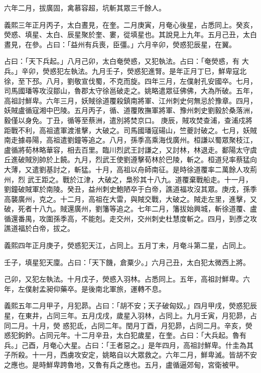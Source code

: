 \begin{pinyinscope}
 六年二月，拔廣固，禽慕容超，坑斬其眾三千餘人。



 義熙三年正月丙子，太白晝見，在奎。二月庚寅，月奄心後星，占悉同上。癸亥，熒惑、填星、太白、辰星聚於奎、婁，從填星也。其說見上九年。五月己丑，太白晝見，在參。占曰：「益州有兵喪，臣彊。」六月辛卯，熒惑犯辰星，在翼。



 占曰：「天下兵起。」八月己卯，太白奄熒惑，又犯執法。占曰：「奄熒惑，有
 大兵。」辛卯，熒惑犯左執法。九月壬子，熒惑犯進腎。是年正月丁巳，鮮卑寇北徐，至下邳。八月，劉敬宣伐蜀，不克而旋。四年三月，左僕射孔安國卒。七月，司馬國璠等攻沒鄒山，魯郡太守徐邕破走之。姚略遣眾征佛佛，大為所破。五年，高祖討鮮卑。六年三月，妖賊徐道覆殺鎮南將軍、江州刺史何無忌於豫章。四月，妖賊盧循寇湘中巴陵。五月丙子，循、道覆敗撫軍將軍、豫州刺史劉毅於桑落洲，毅僅以身免。丁丑，循等至蔡洲，遣別將焚京口。
 庚辰，賊攻焚查浦，查浦戍將距戰不利，高祖遣軍渡淮擊，大破之。司馬國璠寇碭山，竺夔討破之。七月，妖賊南走據尋陽，高祖遣劉鐘等追之。八月，孫季高乘海伐廣州。桓謙以蜀眾聚枝江，盧循將荀林略華容，相去百里。臨川烈武王討謙之，又討林，林退走。鄱陽太守虞丘進破賊別帥於上饒。九月，烈武王使劉遵擊荀林於巴陵，斬之。桓道兒率蔡猛向大薄，又遣劉基討之，斬猛。十月，高祖以舟師南征。是時徐道覆率二萬餘人攻荊州，烈
 武王距之。戰於江津，大破之，梟殄其十八九。道覆棄戰船走。十一月，劉鐘破賊軍於南陵。癸丑，益州刺史鮑陋卒于白帝，譙道福攻沒其眾。庚戌，孫季高襲廣州，克之。十二月，高祖在大雷，與賊交戰，大破之。賊走左里，進擊，又破，死者十八九。賊還廣州，劉籓等追之。七年二月，籓拔始興城，斬徐道覆、盧循還番禺，攻圍孫季高，不能剋。走交州，交州刺史杜慧度斬之。四月，到彥之攻譙道福於白帝，拔之。



 義熙四年正月庚子，熒惑犯天江，占同上。五月丁未，月奄斗第二星，占同上。



 壬子，填星犯天廩。占曰：「天下饑，倉粟少。」六月己丑，太白犯太微西上將。



 己卯，又犯左執法。十月戊子，熒惑入羽林。占悉同上。五年，高祖討鮮卑。六年，左僕射孟昶仰藥卒。是後南北軍旅，運轉不息。



 義熙五年二月甲子，月犯昴。占曰：「胡不安；天子破匈奴。」四月甲戌，熒惑犯辰星，在東井，占同三年。五月戊戌，歲星入羽林，占同上。九月壬寅，月犯昴，占同二月。十月，熒
 惑犯氐，占同二年。閏月丁酉，月犯昴，占同二月。辛亥，熒惑犯鉤鈐。占同元年。十二月辛丑，太白犯歲星，在奎。占曰：「大兵起。魯有兵。」己酉，月奄心大星。占曰：「王者惡之。」是年四月，高祖討鮮卑。什圭為其子所殺。十一月，西虜攻安定，姚略自以大眾救之。六年二月，鮮卑滅。皆胡不安之應也。是時鮮卑跨魯地，又魯有兵之應也。五月，盧循逼郊甸，宮衛被甲。




\end{pinyinscope}
